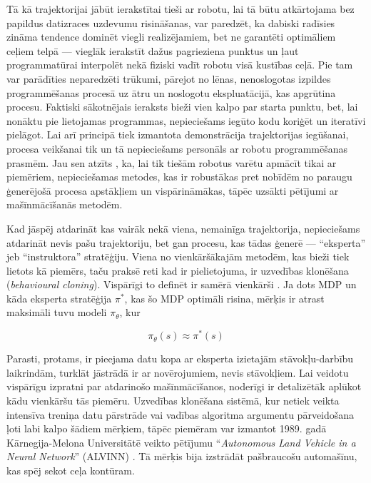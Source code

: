 \documentclass[12pt, a4paper]{article}
\numberwithin{equation}{section} %
\begin{document}
Tā kā trajektorijai jābūt ierakstītai tieši ar robotu, lai tā būtu atkārtojama bez papildus datizraces uzdevumu risināšanas, var paredzēt, ka dabiski radīsies zināma tendence dominēt viegli realizējamiem, bet ne garantēti optimāliem ceļiem telpā --- vieglāk ierakstīt dažus pagrieziena punktus un ļaut programmatūrai interpolēt nekā fiziski vadīt robotu visā kustības ceļā. Pie tam var parādīties neparedzēti trūkumi, pārejot no lēnas, nenoslogotas izpildes programmēšanas procesā uz ātru un noslogotu ekspluatācijā, kas apgrūtina procesu. Faktiski sākotnējais ieraksts bieži vien kalpo par starta punktu, bet, lai nonāktu pie lietojamas programmas, nepieciešams iegūto kodu koriģēt un iteratīvi pielāgot. Lai arī principā tiek izmantota demonstrācija trajektorijas iegūšanai, procesa veikšanai tik un tā nepieciešams personāls ar robotu programmēšanas prasmēm. Jau sen atzīts \cite{muench1994robot,billard2008handbook}, ka, lai tik tiešām robotus varētu apmācīt tikai ar piemēriem, nepieciešamas metodes, kas ir robustākas pret nobīdēm no paraugu ģenerējošā procesa apstākļiem un vispārināmākas, tāpēc uzsākti pētījumi ar mašīnmācīšanās metodēm.

Kad jāspēj atdarināt kas vairāk nekā viena, nemainīga trajektorija, nepieciešams atdarināt nevis pašu trajektoriju, bet gan procesu, kas tādas ģenerē --- ``eksperta'' jeb ``instruktora'' stratēģiju. Viena no vienkāršākajām metodēm, kas bieži tiek lietots kā piemērs, taču praksē reti kad ir pielietojuma, ir uzvedības klonēšana (\textit{behavioural cloning}). Vispārīgi to definēt ir samērā vienkārši \cite{attia2018global}. Ja dots MDP un kāda eksperta stratēģija $\pi^*$, kas šo MDP optimāli risina, mērķis ir atrast maksimāli tuvu modeli $\pi_{\theta}$, kur

\begin{equation}
    \pi_{\theta}(s) \approx \pi^*(s)
\end{equation}

Parasti, protams, ir pieejama datu kopa ar eksperta izietajām stāvokļu-darbību laikrindām, turklāt jāstrādā ir ar novērojumiem, nevis stāvokļiem. Lai veidotu vispārīgu izpratni par atdarinošo mašīnmācīšanos, noderīgi ir detalizētāk aplūkot kādu vienkāršu tās piemēru. Uzvedības klonēšana sistēmā, kur netiek veikta intensīva treniņa datu pārstrāde vai vadības algoritma argumentu pārveidošana ļoti labi kalpo šādiem mērķiem, tāpēc piemēram var izmantot 1989. gadā Kārnegija-Melona Universitātē veikto pētījumu ``\textit{Autonomous Land Vehicle in a Neural Network}'' (ALVINN) \cite{pomerleau1989alvinn}. Tā mērķis bija izstrādāt pašbraucošu automašīnu, kas spēj sekot ceļa kontūram.
\end{document}
